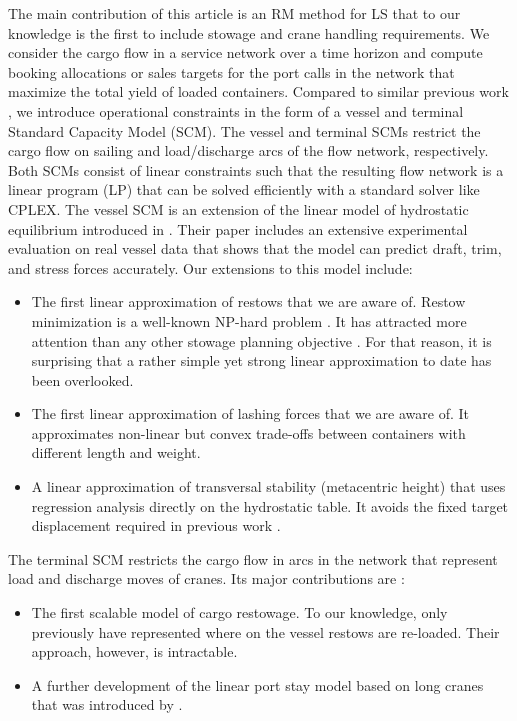 	The main contribution of this article is an RM method for LS that to our knowledge is the first to include stowage and crane handling requirements. We consider the cargo flow in a service network over a time horizon and compute booking allocations or sales targets for the port calls in the network that maximize the total yield of loaded containers. Compared to similar previous work \citep[e.g.,][]{Zurheide15}, we introduce operational constraints in the form of a vessel and terminal Standard Capacity Model (SCM). The vessel and terminal SCMs restrict the cargo flow on sailing and load/discharge arcs of the flow network, respectively. Both SCMs consist of linear constraints such that the resulting flow network is a linear program (LP) that can be solved efficiently with a standard solver like CPLEX. The vessel SCM is an extension of the linear model of hydrostatic equilibrium introduced in \cite{iccl18}. Their paper includes an extensive experimental evaluation on real vessel data that shows that the model can predict draft, trim, and stress forces accurately. Our extensions to this model include:
\begin{itemize}

\item The first linear approximation of restows that we are aware of. Restow minimization is a well-known NP-hard problem \citep{APS00,Tierney14}. It has attracted more attention than any other stowage planning objective \citep[e.g.,][]{GJ03,WYZ05}. For that reason, it is surprising that a rather simple yet strong linear approximation to date has been overlooked. 

\item The first linear approximation of lashing forces that we are aware of. It approximates non-linear but convex trade-offs between containers with different length and weight. 
  
\item A linear approximation of transversal stability (metacentric height) that uses regression analysis directly on the hydrostatic table. It avoids the fixed target displacement required in previous work \citep{pacino12}.
  
\end{itemize}

The terminal SCM restricts the cargo flow in arcs in the network that represent load and discharge moves of cranes. Its major contributions are : 
\begin{itemize}

\item The first scalable model of cargo restowage. To our knowledge, only \cite{BB92} previously have represented where on the vessel restows are re-loaded. Their approach, however, is intractable.

\item A further development of the linear port stay model based on long cranes that was introduced by \cite{pacino11}.    

\end{itemize}

